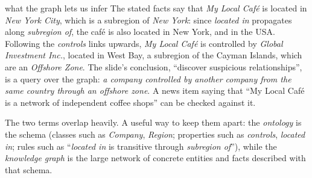 \begin{nbexample}{what the graph lets us infer}
The stated facts say that \emph{My Local Café} is located in \emph{New York City}, which
is a subregion of \emph{New York}: since \emph{located in} propagates along
\emph{subregion of}, the café is also located in New York, and in the USA. Following the
\emph{controls} links upwards, \emph{My Local Café} is controlled by \emph{Global
Investment Inc.}, located in West Bay, a subregion of the Cayman Islands, which are an
\emph{Offshore Zone}. The slide's conclusion, ``discover suspicious relationships'', is
a query over the graph: \emph{a company controlled by another company from the same
country through an offshore zone}. A news item saying that ``My Local Café is a network
of independent coffee shops'' can be checked against it.
\end{nbexample}

\begin{nbintuition}
The two terms overlap heavily. A useful way to keep them apart: the \emph{ontology} is
the schema (classes such as \emph{Company}, \emph{Region}; properties such as
\emph{controls}, \emph{located in}; rules such as ``\emph{located in} is transitive
through \emph{subregion of}''), while the \emph{knowledge graph} is the large network of
concrete entities and facts described with that schema.
\end{nbintuition}
